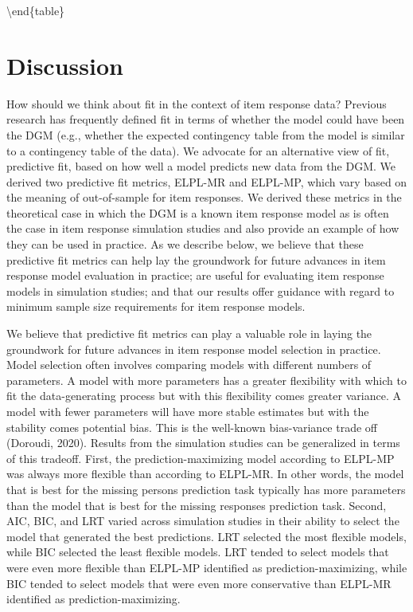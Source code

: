 \documentclass[
  english,
  man,floatsintext]{apa7}
\begin{document}
\textbackslash end\{table\}

\hypertarget{dis}{%
\section{Discussion}\label{dis}}

How should we think about fit in the context of item response data? Previous research has frequently defined fit in terms of whether the model could have been the DGM (e.g., whether the expected contingency table from the model is similar to a contingency table of the data). We advocate for an alternative view of fit, predictive fit, based on how well a model predicts new data from the DGM. We derived two predictive fit metrics, ELPL-MR and ELPL-MP, which vary based on the meaning of out-of-sample for item responses. We derived these metrics in the theoretical case in which the DGM is a known item response model as is often the case in item response simulation studies and also provide an example of how they can be used in practice. As we describe below, we believe that these predictive fit metrics can help lay the groundwork for future advances in item response model evaluation in practice; are useful for evaluating item response models in simulation studies; and that our results offer guidance with regard to minimum sample size requirements for item response models.

We believe that predictive fit metrics can play a valuable role in laying the groundwork for future advances in item response model selection in practice. Model selection often involves comparing models with different numbers of parameters. A model with more parameters has a greater flexibility with which to fit the data-generating process but with this flexibility comes greater variance. A model with fewer parameters will have more stable estimates but with the stability comes potential bias. This is the well-known bias-variance trade off (Doroudi, 2020). Results from the simulation studies can be generalized in terms of this tradeoff. First, the prediction-maximizing model according to ELPL-MP was always more flexible than according to ELPL-MR. In other words, the model that is best for the missing persons prediction task typically has more parameters than the model that is best for the missing responses prediction task. Second, AIC, BIC, and LRT varied across simulation studies in their ability to select the model that generated the best predictions. LRT selected the most flexible models, while BIC selected the least flexible models. LRT tended to select models that were even more flexible than ELPL-MP identified as prediction-maximizing, while BIC tended to select models that were even more conservative than ELPL-MR identified as prediction-maximizing.
\end{document}
